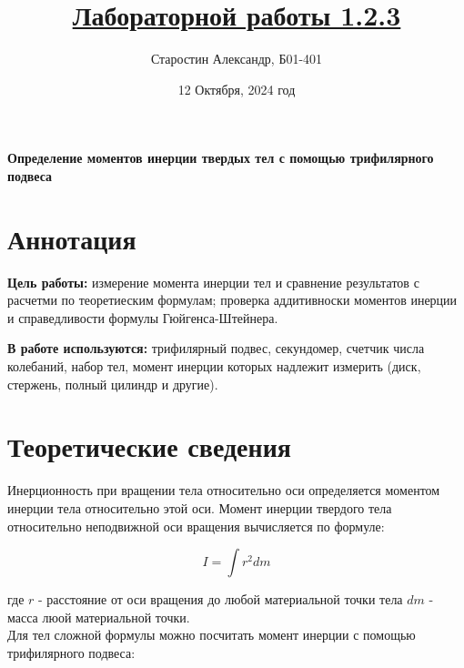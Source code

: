 \documentclass[a4paper]{article}
\title{\underline{Лабораторной работы 1.2.3}}
\author{Старостин Александр, Б01-401}
\date {12 Октября, 2024 год}
\begin{document}
\maketitle
\newpage

\textbf{Определение моментов инерции твердых тел с помощью трифилярного подвеса}

\section{Аннотация}
    \par \textbf{Цель работы:} измерение момента инерции тел и сравнение результатов с расчетми по теоретиеским формулам; проверка аддитивноски моментов инерции и справедливости формулы Гюйгенса-Штейнера.\\

    \par \textbf{В работе используются:} трифилярный подвес, секундомер, счетчик числа колебаний, набор тел, момент инерции которых надлежит измерить (диск, стержень, полный цилиндр и другие).

\section{Теоретические сведения}

\par Инерционность при вращении тела относительно оси определяется моментом инерции тела относительно этой оси. Момент инерции твердого тела относительно неподвижной оси вращения вычисляется по формуле:

\begin{equation}
	I = \int r^2 dm
\end{equation}

где $r$ - расстояние от оси вращения до любой материальной точки тела $dm$ - масса люой материальной точки.\\

Для тел сложной формулы можно посчитать момент инерции с помощью трифилярного подвеса:
\end{document}
